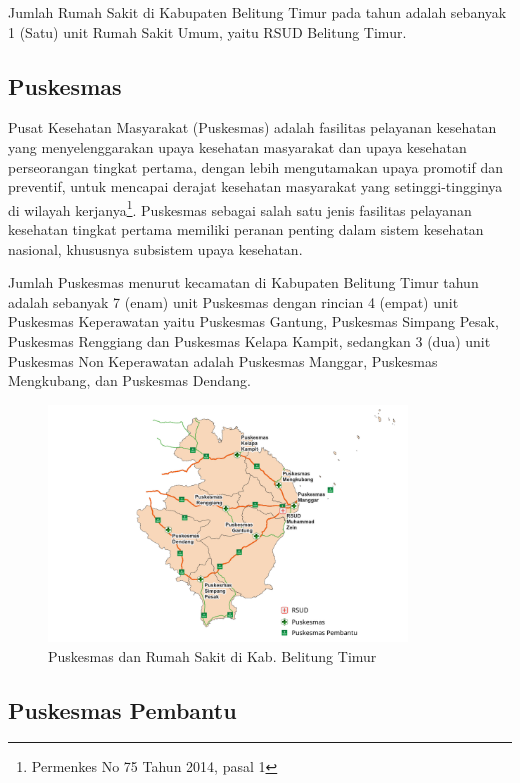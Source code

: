 Jumlah Rumah Sakit di Kabupaten Belitung Timur pada tahun \tP adalah sebanyak 1 (Satu) unit Rumah Sakit Umum, yaitu RSUD Belitung Timur.

\subsection{Puskesmas}

Pusat Kesehatan Masyarakat (Puskesmas) adalah fasilitas pelayanan kesehatan yang menyelenggarakan upaya kesehatan masyarakat dan upaya kesehatan perseorangan tingkat pertama, dengan lebih mengutamakan upaya promotif dan preventif, untuk mencapai derajat kesehatan masyarakat yang setinggi-tingginya di wilayah kerjanya\footnote{Permenkes No 75 Tahun 2014, pasal 1}. Puskesmas sebagai salah satu jenis fasilitas pelayanan kesehatan tingkat pertama memiliki peranan penting dalam sistem kesehatan nasional, khususnya subsistem upaya kesehatan.

Jumlah Puskesmas menurut kecamatan di Kabupaten Belitung Timur tahun \tP adalah sebanyak 7 (enam) unit Puskesmas dengan rincian 4 (empat) unit Puskesmas Keperawatan yaitu Puskesmas Gantung, Puskesmas Simpang Pesak, Puskesmas Renggiang dan Puskesmas Kelapa Kampit, sedangkan 3 (dua) unit Puskesmas Non Keperawatan adalah Puskesmas Manggar, Puskesmas Mengkubang, dan Puskesmas Dendang.

\begin{figure}[H]
	\centering
	\includegraphics[width=0.85\textwidth]{bab_02/bab_02_01_petaFaskes}
	\caption{Puskesmas dan Rumah Sakit di Kab. Belitung Timur}
	\label{fig:peta-puskesmas-rs}
\end{figure}

\subsection{Puskesmas Pembantu}

